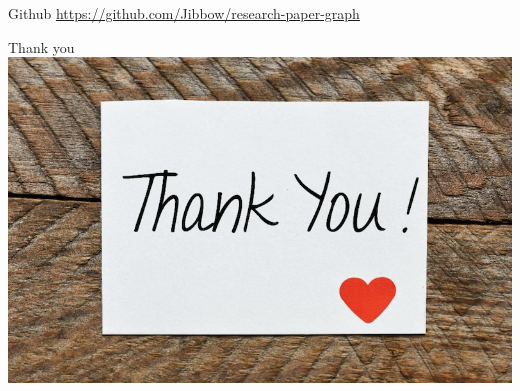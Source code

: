 \documentclass{beamer}
\begin{document}
\begin{frame}{Github}
    \url{https://github.com/Jibbow/research-paper-graph}
\end{frame}

\begin{frame}{Thank you}
    \includegraphics{img_05.png}
\end{frame}
\end{document}
